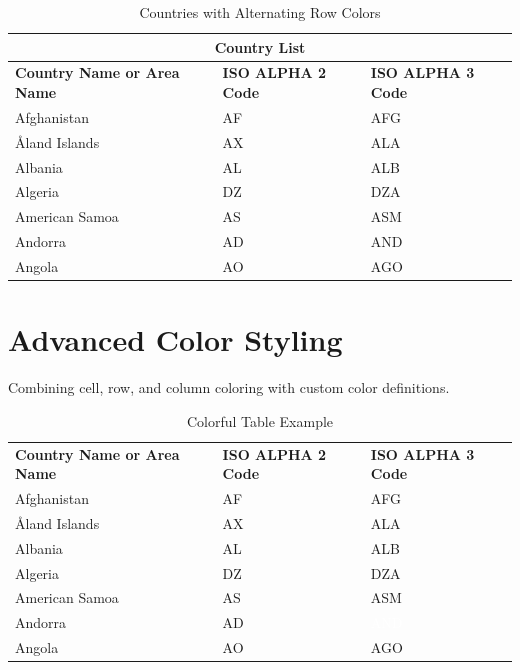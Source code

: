 \documentclass[12pt]{article}
\begin{document}
	\begin{table}[h!]
		\centering
		\caption{Countries with Alternating Row Colors}
		\label{table:altcolors}
		\begin{tabular}{|p{4cm}|p{3.5cm}|p{3.5cm}|}
			\hline
			\multicolumn{3}{|c|}{\textbf{Country List}} \\
			\hline
			\textbf{Country Name or Area Name} & \textbf{ISO ALPHA 2 Code} & \textbf{ISO ALPHA 3 Code} \\
			\hline
			Afghanistan & AF & AFG \\
			Åland Islands & AX & ALA \\
			Albania & AL & ALB \\
			Algeria & DZ & DZA \\
			American Samoa & AS & ASM \\
			Andorra & AD & AND \\
			Angola & AO & AGO \\
			\hline
		\end{tabular}
	\end{table}
	
	\section{Advanced Color Styling}
	Combining cell, row, and column coloring with custom color definitions.
	
	\begin{table}[h!]
		\centering
		\caption{Colorful Table Example}
		\label{table:colorful}
		\begin{tabular}{|L|p{3.5cm}|p{3.5cm}|}
			\hline
			  \\
			\hline
			\textbf{Country Name or Area Name} & \textbf{ISO ALPHA 2 Code} & \textbf{ISO ALPHA 3 Code} \\
			\hline
			Afghanistan & AF & AFG \\
			Åland Islands & AX & ALA \\
			Albania & AL & ALB \\
			Algeria & DZ & DZA \\
			American Samoa & AS & ASM \\
			Andorra & AD & \textcolor{white}{AND} \\
			Angola & AO & AGO \\
			\hline
		\end{tabular}
	\end{table}
	
\end{document}
